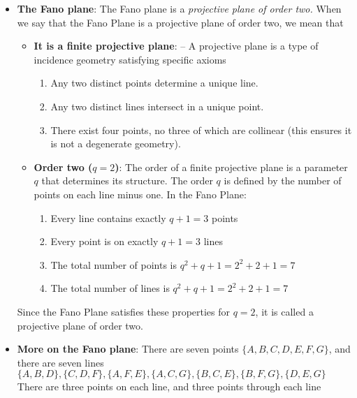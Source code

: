 \documentclass{report}
\begin{document}
\begin{itemize}
        \item \textbf{The Fano plane}: The Fano plane is a \textit{projective plane of order two.}
            \bigbreak \noindent 
            When we say that the Fano Plane is a projective plane of order two, we mean that
        \begin{itemize}
            \item \textbf{It is a finite projective plane}: – A projective plane is a type of incidence geometry satisfying specific axioms
                \begin{enumerate}
                    \item Any two distinct points determine a unique line.
                    \item Any two distinct lines intersect in a unique point.
                    \item There exist four points, no three of which are collinear (this ensures it is not a degenerate geometry).
                \end{enumerate}
            \item \textbf{Order two ($q = 2$)}: The order of a finite projective plane is a parameter $q$ that determines its structure. The order $q$ is defined by the number of points on each line minus one. In the Fano Plane:
                \begin{enumerate}
                    \item Every line contains exactly  $q+1=3$ points
                    \item Every point is on exactly $q+1 = 3$ lines
                    \item The total number of points is $q^{2} + q + 1 = 2^{2} + 2 + 1 = 7 $
                    \item The total number of lines is $q^{2} + q + 1 = 2^{2} + 2  + 1 = 7 $
                \end{enumerate}
        \end{itemize}
        Since the Fano Plane satisfies these properties for $q=2$, it is called a projective plane of order two.
    \item \textbf{More on the Fano plane}: There are seven points $\{A,B,C,D,E,F,G\}$, and there are seven lines $\{A,B,D\}, \{C,D,F\}, \{A,F,E\}, \{A,C,G\}, \{B,C,E\}, \{B,F,G\}, \{D,E,G\}$
        \bigbreak \noindent 
        There are three points on each line, and three points through each line
        \bigbreak \noindent 
        \begin{figure}[ht]
            \centering

\end{figure}
\end{itemize}
\end{document}
